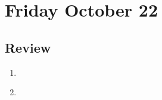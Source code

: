 \newpage
\section*{Friday October 22}




\newpage


\newpage
\subsection*{Review}
\begin{enumerate}
\item \hspace{1in}\\
\item \hspace{1in}\\
\end{enumerate}



